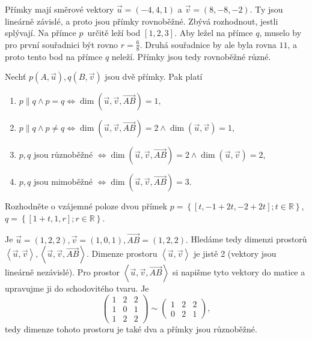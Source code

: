 \begin{reseni}
Přímky mají směrové vektory $\vec u = (-4,4,1)$ a $\vec v = (8,-8,-2)$. Ty jsou lineárně závislé, a proto jsou přímky
rovnoběžné. Zbývá rozhodnout, jestli splývají. Na přímce $p$~určitě leží bod $[1,2,3]$. Aby ležel na přímce $q$, muselo by pro
první souřadnici být rovno $r=\frac{6}{8}$. Druhá souřadnice by ale byla rovna $11$, a proto tento bod na přímce $q$ neleží.
Přímky jsou tedy rovnoběžné různé.
\end{reseni}

\begin{veta}
    Nechť $p(A,\vec u), q(B, \vec v)$ jsou dvě přímky. Pak platí
    \begin{enumerate}[$i.$]
    \item $p\parallel q \land p=q \iff \dim(\vec u, \vec v, \overrightarrow{AB})=1,$
   	\item $p\parallel q \land p\ne q \iff \dim(\vec u, \vec v, \overrightarrow{AB})=2 \land \dim ( \vec u, \vec v) = 1$,
    \item $p, q$ jsou různoběžné $ \iff \dim(\vec u, \vec v, \overrightarrow{AB})=2 \land \dim ( \vec u, \vec v) = 2$,
    \item $p, q$ jsou mimoběžné $\iff \dim(\vec u, \vec v, \overrightarrow{AB})=3.$
    \end{enumerate}
\end{veta}

\begin{priklad}
Rozhodněte o vzájemné poloze dvou přímek $p=\left \{ [t,-1+2t,-2+2t]; t \in \mathbb R \right \}$, $q=\left \{ [1+t,1,r]; r \in \mathbb R \right \}.  $
\end{priklad}

\begin{reseni}
Je $\vec u = (1,2,2), \vec v = (1,0,1), \overrightarrow{AB}=(1,2,2).$ Hledáme tedy
dimenzi prostorů $\left<  \vec u, \vec v \right>, \left<  \vec u, \vec v, \overrightarrow{AB} \right>.  $
Dimenze prostoru $\left < \vec u, \vec v \right > $ je jistě 2 (vektory jsou lineárně nezávislé). Pro prostor
$\left < \vec u, \vec v, \overrightarrow{AB} \right > $
si napišme  tyto vektory do matice a upravujme ji do schodovitého tvaru. Je
$$
\begin{pmatrix}
	1 & 2 & 2 \\
	1 & 0 & 1 \\
	1 & 2 & 2
\end{pmatrix} \sim \begin{pmatrix}
	1 & 2 & 2 \\
	0 & 2 & 1
\end{pmatrix},
$$
tedy dimenze tohoto prostoru je také dva a přímky jsou různoběžné.
\end{reseni}

